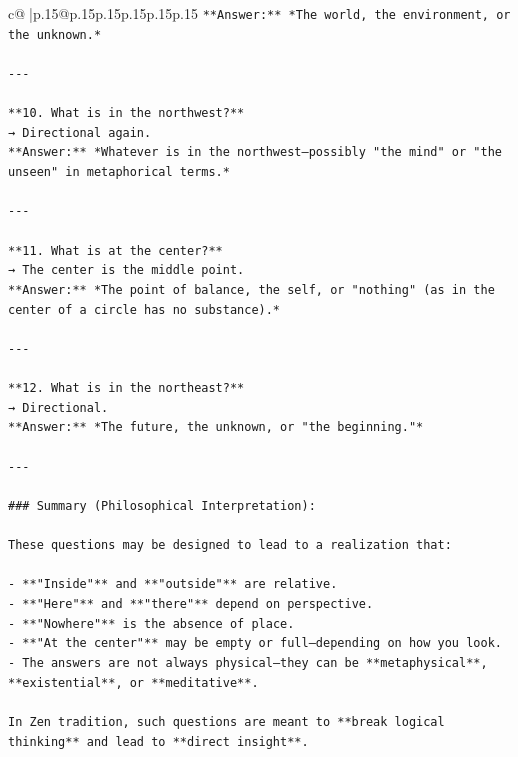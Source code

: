\documentclass{article}
\begin{document}
{\begin{supertabular}{c@{$\;$}|p{.15\linewidth}@{}p{.15\linewidth}p{.15\linewidth}p{.15\linewidth}p{.15\linewidth}p{.15\linewidth}}
{{{\texttt{**Answer:** *The world, the environment, or the unknown.*} \\
\\ 
\texttt{{-}{-}{-}} \\
\\ 
\texttt{**10. What is in the northwest?**  } \\
\texttt{→ Directional again.  } \\
\texttt{**Answer:** *Whatever is in the northwest—possibly "the mind" or "the unseen" in metaphorical terms.*} \\
\\ 
\texttt{{-}{-}{-}} \\
\\ 
\texttt{**11. What is at the center?**  } \\
\texttt{→ The center is the middle point.  } \\
\texttt{**Answer:** *The point of balance, the self, or "nothing" (as in the center of a circle has no substance).*} \\
\\ 
\texttt{{-}{-}{-}} \\
\\ 
\texttt{**12. What is in the northeast?**  } \\
\texttt{→ Directional.  } \\
\texttt{**Answer:** *The future, the unknown, or "the beginning."*} \\
\\ 
\texttt{{-}{-}{-}} \\
\\ 
\texttt{\#\#\# Summary (Philosophical Interpretation):} \\
\\ 
\texttt{These questions may be designed to lead to a realization that:} \\
\\ 
\texttt{{-} **"Inside"** and **"outside"** are relative.} \\
\texttt{{-} **"Here"** and **"there"** depend on perspective.} \\
\texttt{{-} **"Nowhere"** is the absence of place.} \\
\texttt{{-} **"At the center"** may be empty or full—depending on how you look.} \\
\texttt{{-} The answers are not always physical—they can be **metaphysical**, **existential**, or **meditative**.} \\
\\ 
\texttt{In Zen tradition, such questions are meant to **break logical thinking** and lead to **direct insight**.} \\
}}}
\end{supertabular}}
\end{document}
